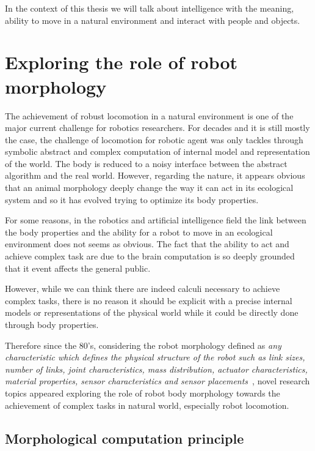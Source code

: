 In the context of this thesis we will talk about intelligence with the meaning, ability to move in a natural environment and interact with people and objects.



\section{Exploring the role of robot morphology} %

The achievement of robust locomotion in a natural environment is one of the major current challenge for robotics researchers. For decades and it is still mostly the case, the challenge of locomotion for robotic agent was only tackles through symbolic abstract and complex computation of internal model and representation of the world. The body is reduced to a noisy interface between the abstract algorithm and the real world.
However, regarding the nature, it appears obvious that an animal morphology deeply change the way it can act in its ecological system and so it has evolved trying to optimize its body properties.

For some reasons, in the robotics and artificial intelligence field the link between the body properties and the ability for a robot to move in an ecological environment does not seems as obvious. The fact that the ability to act and achieve complex task are due to the brain computation is so deeply grounded that it event affects the general public.

However, while we can think there are indeed calculi necessary to achieve complex tasks, there is no reason it should be explicit with a precise internal models or representations of the physical world while it could be directly done through body properties.

Therefore since the 80's, considering the robot morphology defined as \emph{any characteristic which defines the physical structure of the robot such as link sizes, number of links, joint characteristics, mass distribution, actuator characteristics, material properties, sensor characteristics and sensor placements}~\cite{paul2006morphological}, novel research topics appeared exploring the role of robot body morphology towards the achievement of complex tasks in natural world, especially robot locomotion.


\subsection{Morphological computation principle} %

